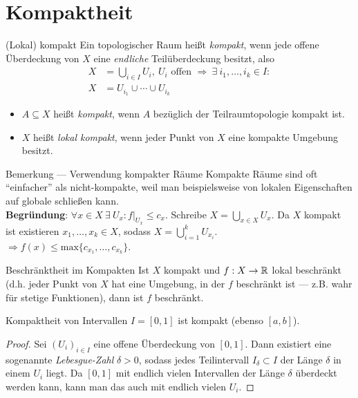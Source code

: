 \section{Kompaktheit}

\begin{definition}{(Lokal) kompakt}
  Ein topologischer Raum heißt \emph{kompakt}, wenn jede offene Überdeckung von $ X $ eine \emph{endliche} Teilüberdeckung besitzt, also
  \begin{align*}
    X &= \bigcup_{i \in I} U_i, \ U_i \text{ offen } \Rightarrow \ \exists \ i_1, \dots, i_k \in I : \\
    X &= U_{i_1} \cup \cdots \cup U_{i_k}
  \end{align*}
  \begin{itemize}
    \item $ A \subseteq X $ heißt \emph{kompakt}, wenn $ A $ bezüglich der Teilraumtopologie kompakt ist.
    \item $ X $ heißt \emph{lokal kompakt}, wenn jeder Punkt von $ X $ eine kompakte Umgebung besitzt.
  \end{itemize}
\end{definition}

\begin{remark}{Bemerkung --- Verwendung kompakter Räume}
  Kompakte Räume sind oft ``einfacher'' als nicht-kompakte, weil man beispielsweise von lokalen Eigenschaften auf globale schließen kann. \\
  \textbf{Begründung}: $ \forall x \in X \ \exists \ U_x : f\vert_{U_x} \leq c_x $. Schreibe $ X = \bigcup_{x \in X}U_x $. Da $ X $ kompakt ist existieren $ x_1, \dots, x_k \in X $, sodass $ X = \bigcup_{i=1}^k U_{x_i} $. \\
  $ \Rightarrow f(x) \leq \text{max}\{ c_{x_1}, \dots, c_{x_k} \} $.
\end{remark}

\begin{example}{Beschränktheit im Kompakten}
  Ist $ X $ kompakt und $ f: X \to \mathbb{R} $ lokal beschränkt (d.h. jeder Punkt von $ X $ hat eine Umgebung, in der $ f $ beschränkt ist --- z.B. wahr für stetige Funktionen), dann ist $ f $ beschränkt.
\end{example}

\begin{example}{Kompaktheit von Intervallen}
  $ I = [0,1] $ ist kompakt (ebenso $ [a,b] $).
  \begin{proof}
    Sei $ (U_i)_{i \in I} $ eine offene Überdeckung von $ [0,1] $. Dann existiert eine sogenannte \emph{Lebesgue-Zahl} $ \delta > 0 $, sodass jedes Teilintervall $ I_\delta \subset I $ der Länge $ \delta $ in einem $ U_i $ liegt. Da $ [0,1] $ mit endlich vielen Intervallen der Länge $ \delta $ überdeckt werden kann, kann man das auch mit endlich vielen $ U_i $.
  \end{proof}
\end{example}

